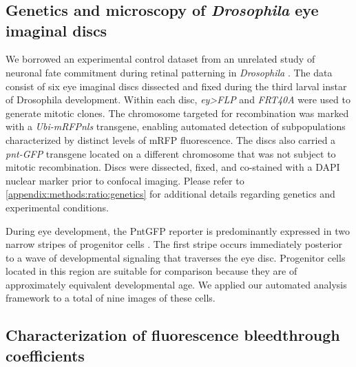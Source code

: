 \graphicspath{ {./figures/clones/} }

\section{}
\label{appendix:methods:clones}


\subsection{Genetics and microscopy of \textit{Drosophila} eye imaginal discs}
\label{appendix:methods:clones:genetics}

We borrowed an experimental control dataset from an unrelated study of neuronal fate commitment during retinal patterning in \textit{Drosophila} \cite{Bernasek2018}. The data consist of six eye imaginal discs dissected and fixed during the third larval instar of Drosophila development. Within each disc, \textit{ey>FLP} and \textit{FRT40A} were used to generate mitotic clones. The chromosome targeted for recombination was marked with a \textit{Ubi-mRFPnls} transgene, enabling automated detection of subpopulations characterized by distinct levels of mRFP fluorescence. The discs also carried a \textit{pnt-GFP} transgene located on a different chromosome that was not subject to mitotic recombination. Discs were dissected, fixed, and co-stained with a DAPI nuclear marker prior to confocal imaging. Please refer to \ref{appendix:methods:ratio:genetics} for additional details regarding genetics and experimental conditions.

During eye development, the PntGFP reporter is predominantly expressed in two narrow stripes of progenitor cells \cite{Bernasek2018}. The first stripe occurs immediately posterior to a wave of developmental signaling that traverses the eye disc. Progenitor cells located in this region are suitable for comparison because they are of approximately equivalent developmental age. We applied our automated analysis framework to a total of nine images of these cells.

\subsection{Characterization of fluorescence bleedthrough coefficients}
\label{appendix:methods:clones:model_fit}

